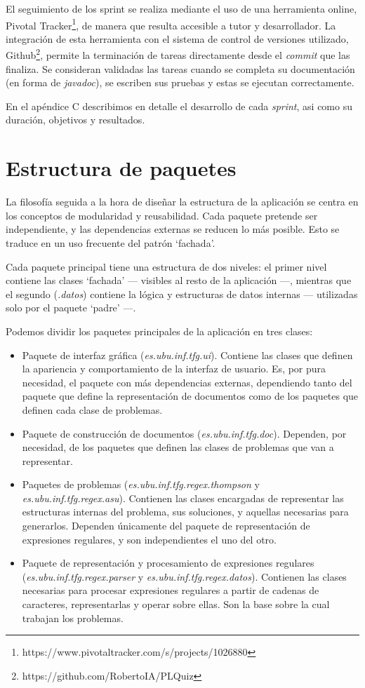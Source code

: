 El seguimiento de los sprint se realiza mediante el uso de una herramienta online, Pivotal Tracker\footnote{https://www.pivotaltracker.com/s/projects/1026880}, de manera que resulta accesible a tutor y desarrollador.
La integración de esta herramienta con el sistema de control de versiones utilizado, Github\footnote{https://github.com/RobertoIA/PLQuiz}, permite la terminación de tareas directamente desde el \emph{commit} que las finaliza.
Se consideran validadas las tareas cuando se completa su documentación (en forma de \emph{javadoc}), se escriben sus pruebas y estas se ejecutan correctamente.

En el apéndice C describimos en detalle el desarrollo de cada \emph{sprint}, asi como su duración, objetivos y resultados.

\section{Estructura de paquetes}
La filosofía seguida a la hora de diseñar la estructura de la aplicación se centra en los conceptos de modularidad y reusabilidad.
Cada paquete pretende ser independiente, y las dependencias externas se reducen lo más posible.
Esto se traduce en un uso frecuente del patrón `fachada'.

Cada paquete principal tiene una estructura de dos niveles: el primer nivel contiene las clases `fachada' --- visibles al resto de la aplicación ---, mientras que el segundo (\emph{.datos}) contiene la lógica y estructuras de datos internas --- utilizadas solo por el paquete `padre' ---.

Podemos dividir los paquetes principales de la aplicación en tres clases:
\begin{itemize}
	\item Paquete de interfaz gráfica (\emph{es.ubu.inf.tfg.ui}).
	Contiene las clases que definen la apariencia y comportamiento de la interfaz de usuario.
	Es, por pura necesidad, el paquete con más dependencias externas, dependiendo tanto del paquete que define la representación de documentos como de los paquetes que definen cada clase de problemas.
	\item Paquete de construcción de documentos (\emph{es.ubu.inf.tfg.doc}).
	Dependen, por necesidad, de los paquetes que definen las clases de problemas que van a representar.
	\item Paquetes de problemas (\emph{es.ubu.inf.tfg.regex.thompson} y \emph{es.ubu.inf.tfg.regex.asu}).
	Contienen las clases encargadas de representar las estructuras internas del problema, sus soluciones, y aquellas necesarias para generarlos.
	Dependen únicamente del paquete de representación de expresiones regulares, y son independientes el uno del otro.
	\item Paquete de representación y procesamiento de expresiones regulares (\emph{es.ubu.inf.tfg.regex.parser} y \emph{es.ubu.inf.tfg.regex.datos}).
	Contienen las clases necesarias para procesar expresiones regulares a partir de cadenas de caracteres, representarlas y operar sobre ellas.
	Son la base sobre la cual trabajan los problemas.
\end{itemize}

